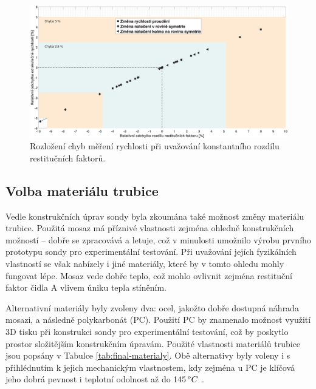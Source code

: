             \begin{figure}[ht!]
                \centering
                \includegraphics*[width=\textwidth]{500_FINAL/final_chyba_mereni.eps}
                \caption{Rozložení chyb měření rychlosti při uvažování konstantního rozdílu restitučních faktorů.}
                \label{fig:sonda-final-chyba-mereni}
            \end{figure}

        \newpage
        \subsection{Volba materiálu trubice}
            Vedle konstrukčních úprav sondy byla zkoumána také možnost změny materiálu trubice. Použitá mosaz má příznivé vlastnosti zejména ohledně konstrukčních možností – dobře se zpracovává a letuje, což v minulosti umožnilo výrobu prvního prototypu sondy pro experimentální testování. Při uvažování jejích fyzikálních vlastností se však nabízely i jiné materiály, které by v tomto ohledu mohly fungovat lépe. Mosaz vede dobře teplo, což mohlo ovlivnit zejména restituční faktor čidla A vlivem úniku tepla stíněním.

            Alternativní materiály byly zvoleny dva: ocel, jakožto dobře dostupná náhrada mosazi, a následně polykarbonát (PC). Použití PC by znamenalo možnost využití 3D tisku při konstrukci sondy pro experimentální testování, což by poskytlo prostor složitějším konstrukčním úpravám. Použité vlastnosti materiálů trubice jsou popsány v Tabulce \ref{tab:final-materialy}. Obě alternativy byly voleny i s přihlédnutím k jejich mechanickým vlastnostem, kdy zejména u PC je klíčová jeho dobrá pevnost i teplotní odolnost až \linebreak do $145 \, ^oC$ \cite{Morgan1976}.

